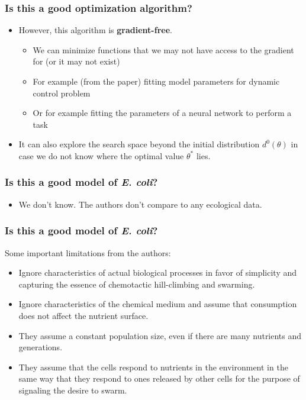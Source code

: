 \documentclass{beamer}
\begin{document}
\begin{frame}
\frametitle{Is this a good optimization algorithm?}
\begin{itemize}
  \item<1-> However, this algorithm is \textbf{gradient-free}.
  \begin{itemize}
    \item<2-> We can minimize functions that we may not have access to the gradient for (or it may not exist)
    \item<2-> For example (from the paper) fitting model parameters for dynamic control problem
    \item<2-> Or for example fitting the parameters of a neural network to perform a task
  \end{itemize}
  \item<3-> It can also explore the search space beyond the initial distribution $d^0(\theta)$ in case we do not know where the optimal value $\theta^*$ lies.
\end{itemize}
\end{frame}

\begin{frame}
\frametitle{Is this a good model of \textit{E. coli}?}
\begin{itemize}
  \item<2-> We don't know. The authors don't compare to any ecological data.
\end{itemize}
\end{frame}


\begin{frame}
\frametitle{Is this a good model of \textit{E. coli}?}
Some important limitations from the authors:
\begin{itemize}
  \item<1> Ignore characteristics of actual biological processes in favor of simplicity and capturing the essence of chemotactic hill-climbing and swarming.
  \item<2> Ignore characteristics of the chemical medium and  assume that consumption does not affect the nutrient surface.
  \item<3> They assume a constant population size, even if there are many nutrients and generations.
  \item<4> They assume that the cells respond to nutrients in the environment in the same way that they respond to ones released by other cells for the purpose of signaling the desire to swarm.
\end{itemize}
\end{frame}
\end{document}
